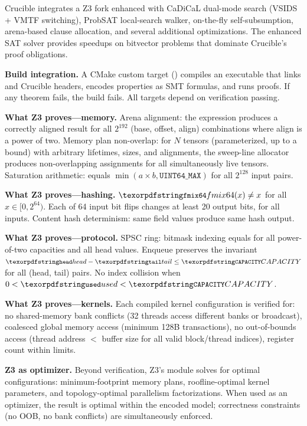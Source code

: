 Crucible integrates a Z3 fork enhanced with CaDiCaL dual-mode search (VSIDS + VMTF switching), ProbSAT local-search walker, on-the-fly self-subsumption, arena-based clause allocation, and several additional optimizations.
The enhanced SAT solver provides speedups on bitvector problems that dominate Crucible's proof obligations.

\textbf{Build integration.}
A CMake custom target () compiles an executable that links  and Crucible headers, encodes properties as SMT formulas, and runs proofs.
If any theorem fails, the build fails.
All targets depend on verification passing.

\textbf{What Z3 proves---memory.}
Arena alignment: the expression  produces a correctly aligned result for all $2^{192}$ (base, offset, align) combinations where align is a power of two.
Memory plan non-overlap: for $N$ tensors (parameterized, up to a bound) with arbitrary lifetimes, sizes, and alignments, the sweep-line allocator produces non-overlapping assignments for all simultaneously live tensors.
Saturation arithmetic:  equals $\min(a \times b, \texttt{UINT64\_MAX})$ for all $2^{128}$ input pairs.

\textbf{What Z3 proves---hashing.}
$\code{fmix64}(x) \neq x$ for all $x \in [0, 2^{64})$.
Each of 64 input bit flips changes at least 20 output bits, for all inputs.
Content hash determinism: same field values produce same hash output.

\textbf{What Z3 proves---protocol.}
SPSC ring: bitmask indexing  equals  for all power-of-two capacities and all head values.
Enqueue preserves the invariant $\code{head} - \code{tail} \leq \code{CAPACITY}$ for all (head, tail) pairs.
No index collision when $0 < \code{used} < \code{CAPACITY}$.

\textbf{What Z3 proves---kernels.}
Each compiled kernel configuration is verified for: no shared-memory bank conflicts (32 threads access different banks or broadcast), coalesced global memory access (minimum 128B transactions), no out-of-bounds access (thread address $<$ buffer size for all valid block/thread indices), register count within limits.

\textbf{Z3 as optimizer.}
Beyond verification, Z3's  module solves for optimal configurations: minimum-footprint memory plans, roofline-optimal kernel parameters, and topology-optimal parallelism factorizations.
When used as an optimizer, the result is optimal within the encoded model; correctness constraints (no OOB, no bank conflicts) are simultaneously enforced.

